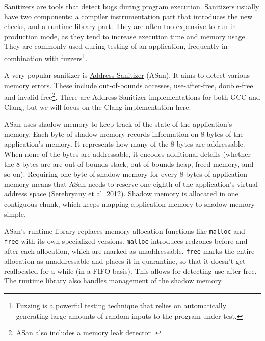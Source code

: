 \documentclass[a4paper,]{report}
\begin{document}
Sanitizers  are tools that detect bugs during program
execution. Sanitizers usually have two components: a compiler
instrumentation part that introduces the new checks, and a runtime
library part. They are often too expensive to run in production mode, as
they tend to increase execution time and memory usage. They are commonly
used during testing of an application, frequently in combination with
fuzzers\footnote{\href{https://en.wikipedia.org/wiki/Fuzzing}{Fuzzing}
   is a powerful testing technique that relies on
  automatically generating large amounts of random inputs to the program
  under test.}.

A very popular sanitizer is
\href{https://clang.llvm.org/docs/AddressSanitizer.html}{Address
Sanitizer} (ASan). It aims to detect
various memory errors. These include out-of-bounds accesses,
use-after-free, double-free and invalid free\footnote{ASan also includes
  a \href{https://clang.llvm.org/docs/LeakSanitizer.html}{memory leak
  detector} .}. There are Address Sanitizer
implementations for both GCC  and Clang, but we
will focus on the Clang implementation here.

ASan uses shadow memory to keep track of the state
of the application's memory. Each byte of shadow memory records
information on 8 bytes of the application's memory. It represents how
many of the 8 bytes are addressable. When none of the bytes are
addressable, it encodes additional details (whether the 8 bytes are are
out-of-bounds stack, out-of-bounds heap, freed memory, and so on).
Requiring one byte of shadow memory for every 8 bytes of application
memory means that ASan needs to reserve one-eighth of the application's
virtual address space (Serebryany et al.
\protect\hyperlink{ref-Serebryany2012}{2012}). Shadow memory is
allocated in one contiguous chunk, which keeps mapping application
memory to shadow memory simple.

ASan's runtime library replaces memory allocation functions like
\texttt{malloc} and \texttt{free} with its own
specialized versions. \texttt{malloc} introduces redzones
before and after each allocation, which are marked as unaddressable.
\texttt{free} marks the entire allocation as unaddressable and places it
in quarantine, so that it doesn't get reallocated for a while (in a FIFO
basis). This allows for detecting use-after-free. The runtime library
also handles management of the shadow memory.
\end{document}
